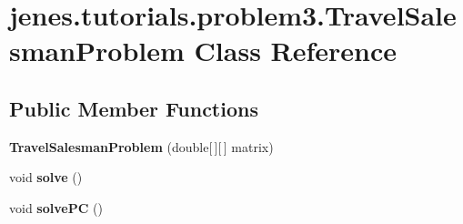 \hypertarget{classjenes_1_1tutorials_1_1problem3_1_1_travel_salesman_problem}{\section{jenes.\-tutorials.\-problem3.\-Travel\-Salesman\-Problem Class Reference}
\label{classjenes_1_1tutorials_1_1problem3_1_1_travel_salesman_problem}
}
\subsection*{Public Member Functions}
\begin{DoxyCompactItemize}
\item 
\hypertarget{classjenes_1_1tutorials_1_1problem3_1_1_travel_salesman_problem_a6a5b57b4c96b1cd6367be99ff5542b0d}{{\bfseries Travel\-Salesman\-Problem} (double\mbox{[}$\,$\mbox{]}\mbox{[}$\,$\mbox{]} matrix)}\label{classjenes_1_1tutorials_1_1problem3_1_1_travel_salesman_problem_a6a5b57b4c96b1cd6367be99ff5542b0d}

\item 
\hypertarget{classjenes_1_1tutorials_1_1problem3_1_1_travel_salesman_problem_ac2507cd4e4fecd4a68fa76dee8ee40e1}{void {\bfseries solve} ()}\label{classjenes_1_1tutorials_1_1problem3_1_1_travel_salesman_problem_ac2507cd4e4fecd4a68fa76dee8ee40e1}

\item 
\hypertarget{classjenes_1_1tutorials_1_1problem3_1_1_travel_salesman_problem_a6f115876612aecf1c22058ebc96f21d8}{void {\bfseries solve\-P\-C} ()}\label{classjenes_1_1tutorials_1_1problem3_1_1_travel_salesman_problem_a6f115876612aecf1c22058ebc96f21d8}

\end{DoxyCompactItemize}
